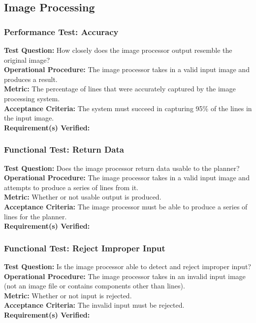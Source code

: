 
\subsection{Image Processing}
\label{sec:verification_image}

\subsubsection{Performance Test: Accuracy}
\label{test:image_pt_accuracy}
\textbf{Test Question:} How closely does the image processor output resemble the original image?\\
\textbf{Operational Procedure:} The image processor takes in a valid input image and produces a result.\\
\textbf{Metric:} The percentage of lines that were accurately captured by the image processing system.\\
\textbf{Acceptance Criteria:} The system must succeed in capturing 95\% of the lines in the input image.\\
\textbf{Requirement(s) Verified:} 

\subsubsection{Functional Test: Return Data}
\label{test:image_ft_data}
\textbf{Test Question:} Does the image processor return data usable to the planner?\\
\textbf{Operational Procedure:} The image processor takes in a valid input image and attempts to produce a series of lines from it.\\
\textbf{Metric:} Whether or not usable output is produced.\\
\textbf{Acceptance Criteria:} The image processor must be able to produce a series of lines for the planner.\\
\textbf{Requirement(s) Verified:} 

\subsubsection{Functional Test: Reject Improper Input}
\label{test:image_ft_reject}
\textbf{Test Question:} Is the image processor able to detect and reject improper input?\\
\textbf{Operational Procedure:} The image processor takes in an invalid input image (not an image file or contains components other than lines). \\
\textbf{Metric:} Whether or not input is rejected.\\
\textbf{Acceptance Criteria:} The invalid input must be rejected.\\
\textbf{Requirement(s) Verified:} 

